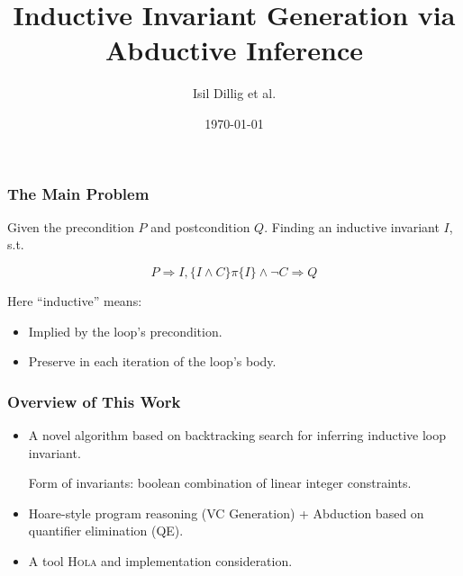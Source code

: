 \documentclass[11pt]{beamer}
\title{Inductive Invariant Generation via Abductive Inference}
\author{Isil Dillig et al.}
\date{\today}
\begin{document}
\maketitle
\begin{frame}\frametitle{The Main Problem}
\begin{definition}
Given the precondition $P$ and postcondition $Q$. Finding an inductive invariant $I$, s.t.

\[P\Longrightarrow I, \{I\wedge C\}\pi\{I\} \wedge \neg C \Longrightarrow Q\]

\end{definition}

Here ``inductive'' means:
\begin{itemize}
\item Implied by the loop's precondition.
\item Preserve in each iteration of the loop's body.

\end{itemize}
\end{frame}

\begin{frame}\frametitle{Overview of This Work}
\begin{itemize}
\item A novel algorithm based on backtracking search for inferring inductive loop invariant. 

Form of invariants: boolean combination of linear integer constraints.

\item Hoare-style program reasoning (VC Generation) + Abduction based on quantifier elimination (QE).

\item A tool \textsc{Hola} and implementation consideration.
\end{itemize}

\end{frame}
\end{document}

